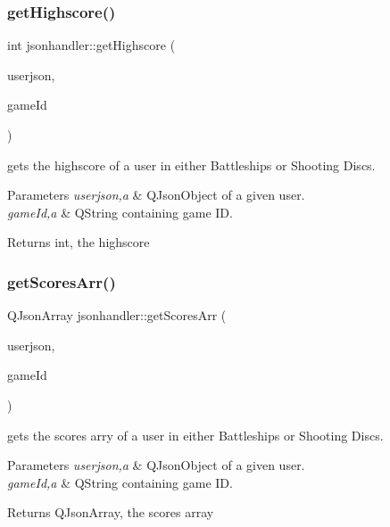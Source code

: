 \subsubsection{\texorpdfstring{get\+Highscore()}{getHighscore()}}
{\footnotesize\ttfamily int jsonhandler\+::get\+Highscore (\begin{DoxyParamCaption}\item[{Q\+Json\+Object}]{userjson,  }\item[{Q\+String}]{game\+Id }\end{DoxyParamCaption})}



gets the highscore of a user in either Battleships or Shooting Discs. 


\begin{DoxyParams}{Parameters}
{\em userjson,a} & Q\+Json\+Object of a given user. \\
\hline
{\em game\+Id,a} & Q\+String containing game ID. \\
\hline
\end{DoxyParams}
\begin{DoxyReturn}{Returns}
int, the highscore 
\end{DoxyReturn}
\mbox{\label{classjsonhandler_aba9044f8e89f6bbe9a136d27062b7358}} 
\subsubsection{\texorpdfstring{get\+Scores\+Arr()}{getScoresArr()}}
{\footnotesize\ttfamily Q\+Json\+Array jsonhandler\+::get\+Scores\+Arr (\begin{DoxyParamCaption}\item[{Q\+Json\+Object}]{userjson,  }\item[{Q\+String}]{game\+Id }\end{DoxyParamCaption})}



gets the scores arry of a user in either Battleships or Shooting Discs. 


\begin{DoxyParams}{Parameters}
{\em userjson,a} & Q\+Json\+Object of a given user. \\
\hline
{\em game\+Id,a} & Q\+String containing game ID. \\
\hline
\end{DoxyParams}
\begin{DoxyReturn}{Returns}
Q\+Json\+Array, the scores array 
\end{DoxyReturn}
\mbox{\label{classjsonhandler_a93f4319d533f65208a05f572b4fd1f76}} 
